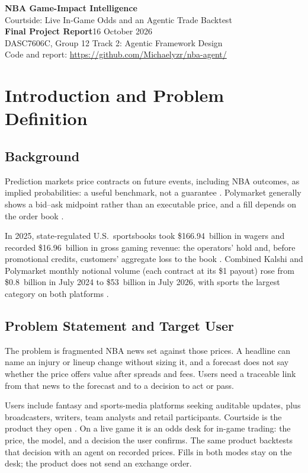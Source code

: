 \documentclass[11pt,a4paper]{article}
\begin{document}
{\LARGE\bfseries\color{navy} NBA Game-Impact Intelligence}\\[4pt]
{\large Courtside: Live In-Game Odds and an Agentic Trade Backtest}\\[6pt]
\textbf{Final Project Report}\hfill 16 October 2026\\
DASC7606C, Group 12 \quad Track 2: Agentic Framework Design\\[4pt]
Code and report: \url{https://github.com/Michaelyzr/nba-agent/}

\section{Introduction and Problem Definition}
\subsection{Background}
Prediction markets price contracts on future events, including NBA outcomes,
as implied probabilities: a useful benchmark, not a guarantee \cite{wolfers}.
Polymarket generally shows a bid--ask midpoint rather than an executable
price, and a fill depends on the order book \cite{polymarket-prices}.

In 2025, state-regulated U.S.\ sportsbooks took \$166.94~billion in wagers and
recorded \$16.96~billion in gross gaming revenue: the operators' hold and,
before promotional credits, customers' aggregate loss to the book
\cite{aga-2025}. Combined Kalshi and Polymarket monthly notional volume (each
contract at its \$1 payout) rose from \$0.8~billion in July 2024 to
\$53~billion in July 2026, with sports the largest category on both platforms
\cite{pew-volume}.

\subsection{Problem Statement and Target User}
The problem is fragmented NBA news set against those prices. A headline can
name an injury or lineup change without sizing it, and a forecast does not
say whether the price offers value after spreads and fees. Users need a traceable link from that news to the forecast and to a
decision to act or pass.

Users include fantasy and sports-media platforms seeking auditable updates,
plus broadcasters, writers, team analysts and retail participants. Courtside
is the product they open \cite{project-readme}. On a live game it is an odds
desk for in-game trading: the price, the model, and a decision the user
confirms. The same product backtests that decision with an agent on recorded
prices. Fills in both modes stay on the desk; the product does not send an
exchange order.
\end{document}
